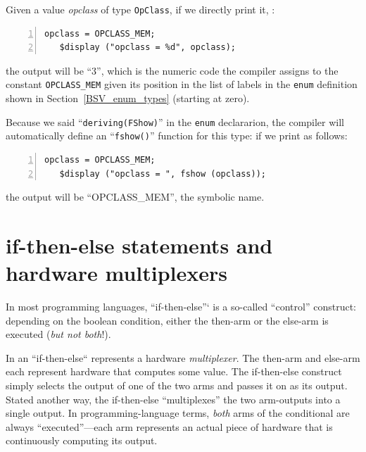 
Given a value \emph{opclass} of type \verb|OpClass|, if we directly
print it, {\eg}:

{\footnotesize
\begin{Verbatim}[frame=single, numbers=left]
   opclass = OPCLASS_MEM;
   $display ("opclass = %d", opclass);
\end{Verbatim}
}

the output will be ``3'', which is the numeric code the compiler
assigns to the constant \verb|OPCLASS_MEM| given its position in the
list of labels in the \verb|enum| definition shown in
Section~\ref{BSV_enum_types} (starting at zero).

Because we said ``\verb|deriving(FShow)|'' in the \verb|enum|
declararion, the {\bsc} compiler will automatically define an
``\verb|fshow()|'' function for this type: if we print as follows:

{\footnotesize
\begin{Verbatim}[frame=single, numbers=left]
   opclass = OPCLASS_MEM;
   $display ("opclass = ", fshow (opclass));
\end{Verbatim}
}

the output will be ``OPCLASS\_MEM'', {\ie} the symbolic name.


\section{if-then-else statements and hardware multiplexers}

\label{BSV_Combo_Circuits_if_then_else}


In most programming languages, ``if-then-else''` is a so-called
``control'' construct: depending on the boolean condition, either the
then-arm or the else-arm is executed (\emph{but not both}!).

In {\BSV} an ``if-then-else`` represents a hardware \emph{multiplexer}.
The then-arm and else-arm each represent hardware that computes some
value.  The if-then-else construct simply selects the output of one of
the two arms and passes it on as its output.  Stated another way, the
if-then-else ``multiplexes'' the two arm-outputs into a single output.
In programming-language terms, \emph{both} arms of the conditional are
always ``executed''---each arm represents an actual piece of hardware
that is continuously computing its output.

